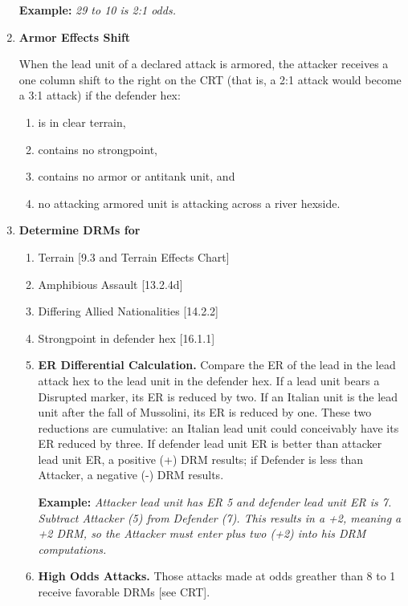 \begin{enumerate}[label=\textbf{\Roman*.}]
    \textbf{Example:} \textit{29 to 10 is 2:1 odds.}
    \item \textbf{Armor Effects Shift}
    \par
    When the lead unit of a declared attack is armored, the attacker receives a one column shift to the right on the CRT (that is, a 2:1 attack would become a 3:1 attack) if the defender hex:
    \begin{enumerate}[label=\alph*.]
        \item is in clear terrain,
        \item contains no strongpoint,
        \item contains no armor or antitank unit, and
        \item no attacking armored unit is attacking across a river hexside.
    \end{enumerate}
    
    \item \textbf{Determine DRMs for}
    
    \begin{enumerate}[label=\alph*.]
        \item Terrain [9.3 and Terrain Effects Chart]
        \item Amphibious Assault [13.2.4d]
        \item Differing Allied Nationalities [14.2.2]
        \item Strongpoint in defender hex [16.1.1]
        \item \textbf{ER Differential Calculation.} Compare the ER of the lead in the lead attack hex to the lead unit in the defender hex. If a lead unit bears a Disrupted marker, its ER is reduced by two. If an Italian unit is the lead unit after the fall of Mussolini, its ER is reduced by one. These two reductions are cumulative: an Italian lead unit could conceivably have its ER reduced by three. If defender lead unit ER is better than attacker lead unit ER, a positive (+) DRM results; if Defender is less than Attacker, a negative (-) DRM results.
        
        \textbf{Example:} \textit{Attacker lead unit has ER 5 and defender lead unit ER is 7. Subtract Attacker (5) from Defender (7). This results in a +2, meaning a +2 DRM, so the Attacker must enter plus two (+2) into his DRM computations.}
        
        \item \textbf{High Odds Attacks.} Those attacks made at odds greather than 8 to 1 receive favorable DRMs [see CRT].
    \end{enumerate}
    

\end{enumerate}
